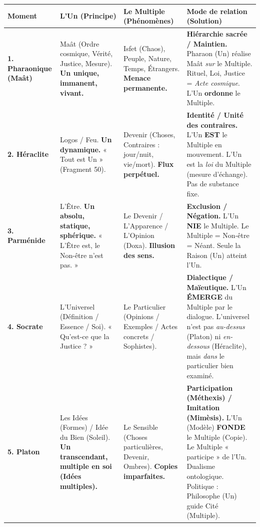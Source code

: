 \documentclass[11pt]{article}
\newcommand{\cle}[1]{{\popxbold\color{popdark}#1}}
\begin{document}
\begin{exoresolu}
\begin{center}
\begin{tabularx}{\linewidth}{|l|X|X|X|}
\hline
\rowcolor{popblueL}
\textbf{Moment} & \textbf{L'Un (Principe)} & \textbf{Le Multiple (Phénomènes)} & \textbf{Mode de relation (Solution)} \\
\hline
\textbf{1. Pharaonique (Maât)} & \cle{Maât} (Ordre cosmique, Vérité, Justice, Mesure). \textbf{Un unique, immanent, vivant.} & \cle{Isfet} (Chaos), Peuple, Nature, Temps, Étrangers. \textbf{Menace permanente.} & \textbf{Hiérarchie sacrée / Maintien.} Pharaon (Un) réalise Maât \emph{sur} le Multiple. Rituel, Loi, Justice = \emph{Acte cosmique}. L'Un \textbf{ordonne} le Multiple. \\
\hline
\textbf{2. Héraclite} & \cle{Logos / Feu}. \textbf{Un dynamique.} « Tout est Un » (Fragment 50). & \cle{Devenir} (Choses, Contraires : jour/nuit, vie/mort). \textbf{Flux perpétuel.} & \textbf{Identité / Unité des contraires.} L'Un \textbf{EST} le Multiple en mouvement. L'Un est la \emph{loi} du Multiple (mesure d'échange). Pas de substance fixe. \\
\hline
\textbf{3. Parménide} & \cle{L'Être}. \textbf{Un absolu, statique, sphérique.} « L'Être est, le Non-être n'est pas. » & \cle{Le Devenir / L'Apparence / L'Opinion (Doxa)}. \textbf{Illusion des sens.} & \textbf{Exclusion / Négation.} L'Un \textbf{NIE} le Multiple. Le Multiple = Non-être = Néant. Seule la Raison (Un) atteint l'Un. \\
\hline
\textbf{4. Socrate} & \cle{L'Universel (Définition / Essence / Soi)}. « Qu'est-ce que la Justice ? » & \cle{Le Particulier (Opinions / Exemples / Actes concrets / Sophistes)}. & \textbf{Dialectique / Maïeutique.} L'Un \textbf{ÉMERGE} du Multiple par le dialogue. L'universel n'est pas \emph{au-dessus} (Platon) ni \emph{en-dessous} (Héraclite), mais \emph{dans} le particulier bien examiné. \\
\hline
\textbf{5. Platon} & \cle{Les Idées (Formes) / Idée du Bien (Soleil)}. \textbf{Un transcendant, multiple en soi (Idées multiples).} & \cle{Le Sensible (Choses particulières, Devenir, Ombres)}. \textbf{Copies imparfaites.} & \textbf{Participation (Méthexis) / Imitation (Mimèsis).} L'Un (Modèle) \textbf{FONDE} le Multiple (Copie). Le Multiple « participe » de l'Un. Dualisme ontologique. Politique : Philosophe (Un) guide Cité (Multiple). \\
\hline
\end{tabularx}
\end{center}


\end{exoresolu}
\end{document}
